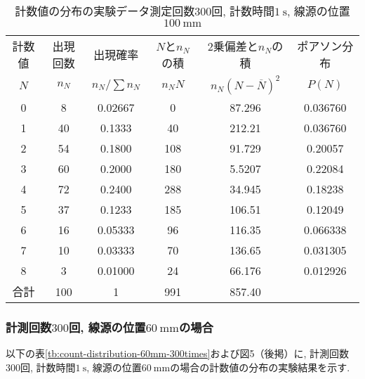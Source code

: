 \documentclass{jarticle}
\begin{document}
\begin{table}[H]
  \caption{計数値の分布の実験データ\protect\linebreak 測定回数$300$回, 計数時間$1\ \mathrm{s}$, 線源の位置$100\ \mathrm{mm}$}
  \label{tb:count-distribution-100mm-300times}
  \hspace{-1cm}
  \begin{tabular}{cccccc}
    \hline
    計数値 & 出現回数 & 出現確率 & $N$と$n_N$の積 & 2乗偏差と$n_N$の積 & ポアソン分布 \\
    $N$ & $n_N$ & $n_N/\sum n_N$ & $n_N N$ & $n_N(N-\overline{N})^2$ & $P(N)$ \\
    \hline
    0 & 8 & 0.02667 & 0 & 87.296 & 0.036760 \\
    1 & 40 & 0.1333 & 40 & 212.21 & 0.036760 \\
    2 & 54 & 0.1800 & 108 & 91.729 & 0.20057 \\
    3 & 60 & 0.2000 & 180 & 5.5207 & 0.22084 \\
    4 & 72 & 0.2400 & 288 & 34.945 & 0.18238 \\
    5 & 37 & 0.1233 & 185 & 106.51 & 0.12049 \\
    6 & 16 & 0.05333 & 96 & 116.35 & 0.066338 \\
    7 & 10 & 0.03333 & 70 & 136.65 & 0.031305 \\
    8 & 3 & 0.01000 & 24 & 66.176 & 0.012926 \\
    \hline
    合計 & 100 & 1 & 991 & 857.40 & \\
    \hline
  \end{tabular}
\end{table}



\subsubsection{計測回数$300$回, 線源の位置$60\ \mathrm{mm}$の場合}

以下の表\ref{tb:count-distribution-60mm-300times}および図5（後掲）に, 計測回数$300$回, 計数時間$1\ \mathrm{s}$, 線源の位置$60\ \mathrm{mm}$の場合の計数値の分布の実験結果を示す.
\end{document}
